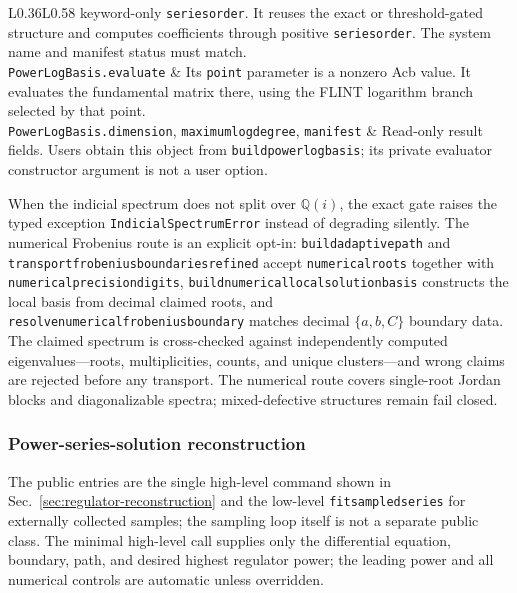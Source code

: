 \documentclass[11pt]{article}
\renewcommand{\_}{\origunderscore\allowbreak}
\begin{document}
\begin{longtable}{L{0.36\textwidth}L{0.58\textwidth}}
keyword-only \texttt{series\_order}.  It reuses the exact or
threshold-gated structure and computes coefficients through positive
\texttt{series\_order}.  The system name and manifest status must match. \\
\texttt{PowerLogBasis.evaluate} & Its \texttt{point} parameter is a nonzero Acb value.  It
evaluates the fundamental matrix there, using the FLINT logarithm branch selected by that
point. \\
\texttt{PowerLogBasis.dimension}, \texttt{maximum\_log\_degree}, \texttt{manifest} &
Read-only result fields.  Users obtain this object from \texttt{build\_power\_log\_basis};
its private evaluator constructor argument is not a user option. \\
\bottomrule
\end{longtable}
\normalsize

When the indicial spectrum does not split over $\mathbb Q(i)$, the exact gate raises the
typed exception \texttt{IndicialSpectrumError} instead of degrading silently.  The numerical
Frobenius route is an explicit opt-in: \texttt{build\_adaptive\_path} and
\texttt{transport\_frobenius\_boundaries\_refined} accept \texttt{numerical\_roots} together
with \texttt{numerical\_precision\_digits}, \texttt{build\_numerical\_local\_solution\_basis}
constructs the local basis from decimal claimed roots, and
\texttt{resolve\_numerical\_frobenius\_boundary} matches decimal $\{a,b,C\}$ boundary data.
The claimed spectrum is cross-checked against independently computed eigenvalues---roots,
multiplicities, counts, and unique clusters---and wrong claims are rejected before any
transport.  The numerical route covers single-root Jordan blocks and diagonalizable spectra;
mixed-defective structures remain fail closed.

\subsubsection{Power-series-solution reconstruction}

The public entries are the single high-level command shown in
Sec.~\ref{sec:regulator-reconstruction} and the low-level \texttt{fit\_sampled\_series} for
externally collected samples; the sampling loop itself is not a separate public class.
The minimal high-level call supplies only the differential equation, boundary, path, and
desired highest regulator power; the leading power and all numerical controls are automatic
unless overridden.
\end{document}
